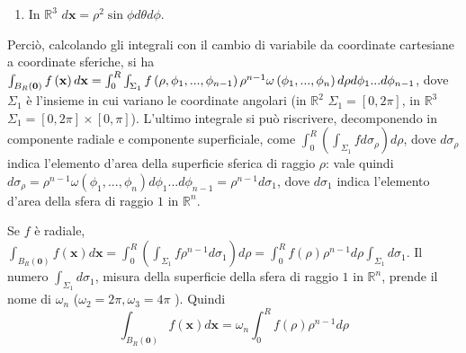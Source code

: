 \documentclass{article}
\begin{document}
\begin{enumerate}
\item In $%
\mathbb{R}
^{3}$ $d\mathbf{x}=\rho ^{2}\sin \phi d\theta d\phi $.
\end{enumerate}

Perci\`{o}, calcolando gli integrali con il cambio di variabile da
coordinate cartesiane a coordinate sferiche, si ha $\int_{B_{R}\left( 
\mathbf{0}\right) }f\left( \mathbf{x}\right) d\mathbf{x}=\int_{0}^{R}\int_{%
\Sigma _{1}}f\left( \rho ,\phi _{1},...,\phi _{n-1}\right) \rho ^{n-1}\omega
\left( \phi _{1},...,\phi _{n}\right) d\rho d\phi _{1}...d\phi _{n-1}$, dove 
$\Sigma _{1}$ \`{e} l'insieme in cui variano le coordinate angolari (in $%
\mathbb{R}
^{2}$ $\Sigma _{1}=\left[ 0,2\pi \right] $, in $%
\mathbb{R}
^{3}$ $\Sigma _{1}=\left[ 0,2\pi \right] \times \left[ 0,\pi \right] $).
L'ultimo integrale si pu\`{o} riscrivere, decomponendo in componente radiale
e componente superficiale, come $\int_{0}^{R}\left( \int_{\Sigma
_{1}}fd\sigma _{\rho }\right) d\rho $, dove $d\sigma _{\rho }$ indica
l'elemento d'area della superficie sferica di raggio $\rho $: vale quindi $%
d\sigma _{\rho }=\rho ^{n-1}\omega \left( \phi _{1},...,\phi _{n}\right)
d\phi _{1}...d\phi _{n-1}=\rho ^{n-1}d\sigma _{1}$, dove $d\sigma _{1}$
indica l'elemento d'area della sfera di raggio $1$ in $%
\mathbb{R}
^{n}$.

Se $f$ \`{e} radiale, $\int_{B_{R}\left( \mathbf{0}\right) }f\left( \mathbf{x%
}\right) d\mathbf{x=}\int_{0}^{R}\left( \int_{\Sigma _{1}}f\rho
^{n-1}d\sigma _{1}\right) d\rho =\int_{0}^{R}f\left( \rho \right) \rho
^{n-1}d\rho \int_{\Sigma _{1}}d\sigma _{1}$. Il numero $\int_{\Sigma
_{1}}d\sigma _{1}$, misura della superficie della sfera di raggio $1$ in $%
\mathbb{R}
^{n}$, prende il nome di $\omega _{n}$ ($\omega _{2}=2\pi ,\omega _{3}=4\pi $%
). Quindi%
\begin{equation*}
\int_{B_{R}\left( \mathbf{0}\right) }f\left( \mathbf{x}\right) d\mathbf{x}%
=\omega _{n}\int_{0}^{R}f\left( \rho \right) \rho ^{n-1}d\rho
\end{equation*}
\end{document}
